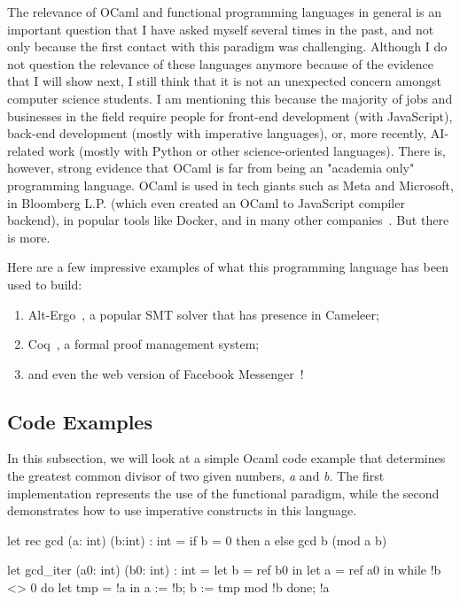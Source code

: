 The relevance of OCaml and functional programming languages in general is an important question that I have asked myself several times in the past, and not only because the first contact with this paradigm was challenging.
Although I do not question the relevance of these languages anymore because of the evidence that I will show next, I still think that it is not an unexpected concern amongst computer science students.
I am mentioning this because the majority of jobs and businesses in the field require people for front-end development (with JavaScript), back-end development (mostly with imperative languages), or, more recently, AI-related work (mostly with Python or other science-oriented languages).
There is, however, strong evidence that OCaml is far from being an "academia only" programming language.
OCaml is used in tech giants such as Meta and Microsoft, in Bloomberg L.P. (which even created an OCaml to JavaScript compiler backend), in popular tools like Docker, and in many other companies~\cite{ocaml_companies}.
But there is more.

Here are a few impressive examples of what this programming language has been used to build: 
\begin{enumerate}
  \item Alt-Ergo~\cite{altergo}, a popular SMT solver that has presence in Cameleer;
  \item Coq~\cite{coq}, a formal proof management system;
  \item and even the web version of Facebook Messenger~\cite{messenger}!
\end{enumerate}

\subsection{Code Examples} 
\label{sub:examples_ocaml}

In this subsection, we will look at a simple Ocaml code example that determines the greatest common divisor of two given numbers, \emph{a} and \emph{b}.
The first implementation represents the use of the functional paradigm, while the second demonstrates how to use imperative constructs in this language.

\begin{ocamlsmall}
  let rec gcd (a: int) (b:int) : int =
      if b = 0 then a
      else gcd b (mod a b) 
\end{ocamlsmall}

\begin{ocamlsmall}
  let gcd_iter (a0: int) (b0: int) : int =
      let b = ref b0 in
      let a = ref a0 in
      while !b <> 0 do
          let tmp = !a in
          a := !b;
          b := tmp mod !b
      done;
      !a
\end{ocamlsmall}

